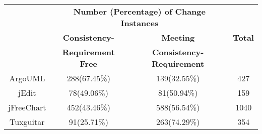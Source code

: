 \begin{table}[htbp]
\vspace{0.5em}\centering\wuhao
\begin{tabular}{cccc}
\toprule[1.5pt]
~\multirow{3}{*}{\textbf{Project}}& \multicolumn{2}{c}{\textbf{Number (Percentage) of Change Instances}} & \multirow{3}{*}{\textbf{Total}}\\ 
 \cline{2-3}
 ~& \textbf{Consistency-} &\textbf{Meeting} & ~\\
 &\textbf{Requirement Free}&\textbf{Consistency-Requirement}&\\
\midrule[1pt]
ArgoUML&288(67.45\%)&139(32.55\%)&427\\
jEdit&78(49.06\%)&81(50.94\%)&159\\
jFreeChart&452(43.46\%)&588(56.54\%)&1040\\
Tuxguitar&91(25.71\%)&263(74.29\%)&354\\
\bottomrule[1.5pt]
\end{tabular}
\end{table}




